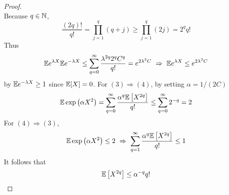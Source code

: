 \begin{enumerate}[label=\arabic{*}.]
\begin{proof}
\begin{equation*}
	    \end{equation*}
	    Because $q \in \mathbb{N}$,
	    \begin{equation*}
	    	\frac{(2 q)!}{q!}=\prod_{j=1}^q(q+j) \geq \prod_{j=1}^q(2 j)=2^q q!
	    \end{equation*}
	    Thus
	    \begin{equation*}
	    	\mathbb{E} e^{\lambda X} \mathbb{E} e^{-\lambda X} \leq \sum_{q=0}^{\infty} \frac{\lambda^{2 q} 2^q C^q}{q!}=e^{2 \lambda^2 C}~\Rightarrow~\mathbb{E} e^{\lambda X} \leq e^{2 \lambda^2 C}
	    \end{equation*}
	    by $\mathbb{E} e^{-\lambda X} \geq 1$ since $\mathbb{E}[X] = 0$. For $(3) \Rightarrow (4)$, by setting $ \alpha = 1 /(2C)$
	    \begin{equation*}
	    	\mathbb{E} \exp \left(\alpha X^2\right)=\sum_{q=0}^{\infty} \frac{\alpha^q \mathbb{E}\left[X^{2 q}\right]}{q!} \leq \sum_{q=0}^{\infty} 2^{-q}=2
	    \end{equation*}
	    For $(4) \Rightarrow (3)$,
	    \begin{equation*}
	    	\mathbb{E} \exp \left(\alpha X^2\right) \leq 2~\Rightarrow~\sum_{q=1}^{\infty} \frac{\alpha^q \mathbb{E}\left[X^{2 q}\right]}{q!} \leq 1
	    \end{equation*}
	    It follows that
	    \begin{equation*}
	    	\mathbb{E}\left[X^{2 q}\right] \leq \alpha^{-q} q! \qedhere
	    \end{equation*}
	\end{proof}


\end{enumerate}

